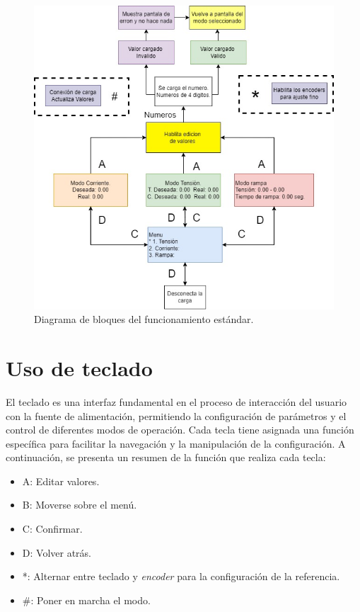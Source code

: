 \begin{figure}[H]
    \centering
    \includegraphics[scale=0.7]{./imagenes/MoverseSobreMenu.jpg}
    \caption{Diagrama de bloques del funcionamiento estándar.}
    \label{F:funcionamiento_normal}
\end{figure}

\section{Uso de teclado} 
El teclado es una interfaz fundamental en el proceso de interacción del usuario con la fuente de alimentación, permitiendo la configuración de parámetros y el control de diferentes modos de operación. Cada tecla tiene asignada una función específica para facilitar la navegación y la manipulación de la configuración. A continuación, se presenta un resumen de la función que realiza cada tecla:
\begin{itemize}
    \item A: Editar valores.
    \item B: Moverse sobre el menú.
    \item C: Confirmar.
    \item D: Volver atrás.
    \item *: Alternar entre teclado y \textit{encoder} para la configuración de la referencia.
    \item \#: Poner en marcha el modo.
\end{itemize}

